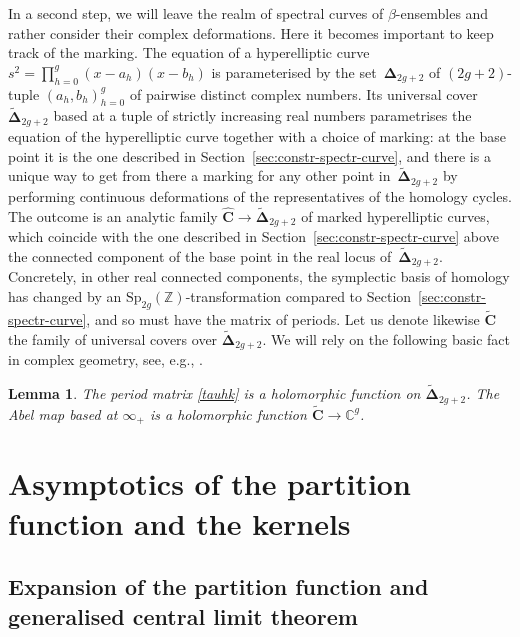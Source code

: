 \documentclass[pdftex]{sigma}
\numberwithin{equation}{section}
\newtheorem{Lemma}[Theorem]{Lemma}
\begin{document}
In a second step, we will leave the realm of spectral curves of
$\beta$-ensembles and rather consider their complex deformations. Here it becomes important to keep track of the marking.
The equation of a hyperelliptic curve $s^2 = \prod_{h = 0}^{g} (x - a_h)(x - b_h)$ is parameterised by the set~$\bm{\Delta}_{2g + 2}$ of $(2g + 2)$-tuple $(a_h,b_h)_{h = 0}^{g}$ of pairwise distinct complex numbers. Its universal cover~$\widetilde{\bm{\Delta}}_{2g + 2}$ based at a tuple of strictly increasing real numbers parametrises the equation of the hyperelliptic curve together with a choice of marking: at the base point it is the one described in Section~\ref{sec:constr-spectr-curve}, and there is a unique way to get from there a marking for any other point in~$\widetilde{\bm{\Delta}}_{2g + 2}$ by performing continuous deformations of the representatives of the homology cycles. The outcome is an analytic family $\hat{\bm{C}} \rightarrow \widetilde{\bm{\Delta}}_{2g + 2}$ of marked hyperelliptic curves, which coincide with the one described in Section~\ref{sec:constr-spectr-curve} above the connected component of the base point in the real locus of~$\widetilde{\bm{\Delta}}_{2g + 2}$. Concretely, in other real connected components, the symplectic basis of homology has changed by an $\text{Sp}_{2g}(\mathbb{Z})$-transformation compared to Section~\ref{sec:constr-spectr-curve}, and so must have the matrix of periods. Let us denote likewise $\widetilde{\bm{C}}$ the family of universal covers over $\widetilde{\bm{\Delta}}_{2g + 2}$. We will rely on the following basic fact in complex geometry, see, e.g., \cite[Chapter
1]{period-book}.
\begin{Lemma}\label{lem:holo-periods}
 The period matrix \eqref{tauhk} is a holomorphic function on $\widetilde{\bm{\Delta}}_{2g + 2}$. The Abel map based at $\infty_+$ is a holomorphic function $\widetilde{\bm{C}} \rightarrow \mathbb{C}^{g}$.
\end{Lemma}



\section{Asymptotics of the partition function and the kernels}

\label{sec:expans-part}
\subsection{Expansion of the partition function and generalised central limit theorem}
\label{sec:expans-part-funct}
\end{document}
